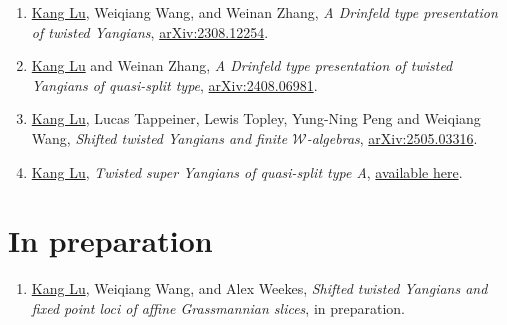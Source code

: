 \documentclass[11pt,letterpaper,roman,colorlinks,urlcolor=blue,linkcolor=blue
]{moderncv}
\begin{document}
\begin{enumerate}[leftmargin=1.37cm]


\item \underline{Kang Lu}, Weiqiang Wang, and Weinan Zhang, {\textit{A Drinfeld type presentation of twisted Yangians}}, \href{https://arxiv.org/abs/2308.12254}{arXiv:2308.12254}. 



\item \underline{Kang Lu} and Weinan Zhang, {\textit{A Drinfeld type presentation of twisted Yangians of quasi-split type}}, \href{https://arxiv.org/abs/2408.06981}{arXiv:2408.06981}.

\item \underline{Kang Lu}, Lucas Tappeiner, Lewis Topley, Yung-Ning Peng and Weiqiang Wang, {\textit{Shifted twisted Yangians and finite $\mathcal W$-algebras}}, \href{https://arxiv.org/abs/2505.03316}{arXiv:2505.03316}.

\item \underline{Kang Lu}, {\textit{Twisted super Yangians of quasi-split type A}}, \href{https://kanglu.me/writings/Twisted_super_Yangians_of_quasi-split_type_A.pdf}{available here}.




\end{enumerate}

\section{In preparation}

\begin{enumerate}[leftmargin=1.37cm]





\item \underline{Kang Lu}, Weiqiang Wang, and Alex Weekes, {\textit{Shifted twisted Yangians and fixed point loci of affine Grassmannian slices}}, in preparation.


\end{enumerate}
\end{document}
